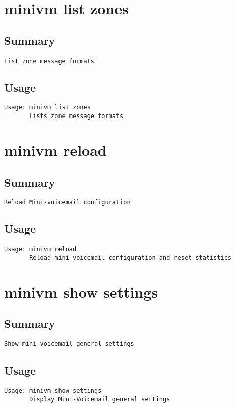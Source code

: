 \section{minivm list zones}
\subsection{Summary}
\begin{verbatim}
List zone message formats
\end{verbatim}
\subsection{Usage}
\begin{verbatim}
Usage: minivm list zones
       Lists zone message formats

\end{verbatim}


\section{minivm reload}
\subsection{Summary}
\begin{verbatim}
Reload Mini-voicemail configuration
\end{verbatim}
\subsection{Usage}
\begin{verbatim}
Usage: minivm reload
       Reload mini-voicemail configuration and reset statistics

\end{verbatim}


\section{minivm show settings}
\subsection{Summary}
\begin{verbatim}
Show mini-voicemail general settings
\end{verbatim}
\subsection{Usage}
\begin{verbatim}
Usage: minivm show settings
       Display Mini-Voicemail general settings

\end{verbatim}


